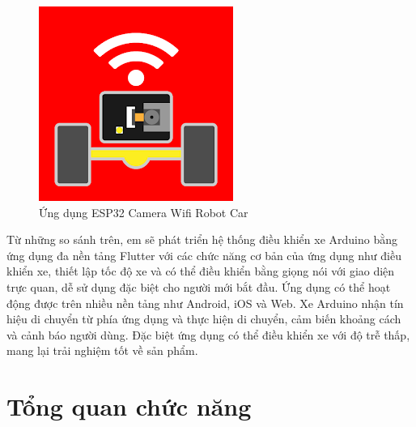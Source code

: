 \documentclass[../DoAn.tex]{subfiles}
\begin{document}
\begin{figure}[!h]
    \includegraphics[scale = 1]{Hinhve/wif_robot_car.png}
    \centering
    \caption{Ứng dụng ESP32 Camera Wifi Robot Car}
\end{figure}

Từ những so sánh trên, em sẽ phát triển hệ thống điều khiển xe Arduino bằng ứng dụng đa nền tảng Flutter với các chức năng cơ bản của ứng dụng như điều khiển xe, thiết lập tốc độ xe và có thể điều khiển bằng giọng nói với giao diện trực quan, dễ sử dụng đặc biệt cho người mới bắt đầu. Ứng dụng có thể hoạt động được trên nhiều nền tảng như Android, iOS và Web. Xe Arduino nhận tín hiệu di chuyển từ phía ứng dụng và thực hiện di chuyển, cảm biến khoảng cách và cảnh báo người dùng. Đặc biệt ứng dụng có thể điều khiển xe với độ trễ thấp, mang lại trải nghiệm tốt về sản phẩm.

\section{Tổng quan chức năng}
\label{section:2.2}
\end{document}
